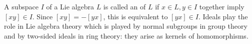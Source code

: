 A subspace $I$ of a Lie algebra $L$ is called an  of $L$ if $x \in L, y \in I$ together imply $[xy] \in I$. Since $[xy] = -[yx]$, this is equivalent to $[yx] \in I$. Ideals play the role in Lie algebra theory which is played by normal subgroups in group theory and by two-sided ideals in ring theory: they arise as kernels of homomorphisms.
